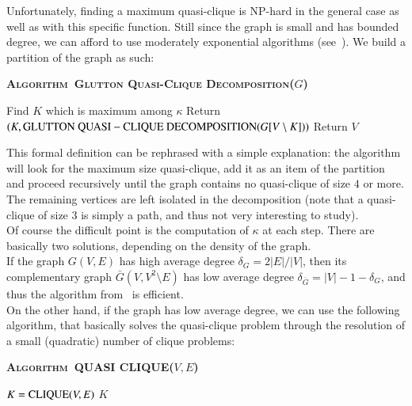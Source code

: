 \documentclass[preprint]{elsarticle}
\newcommand{\algo}[1]{\textsc{Algorithm~#1}}
\begin{document}
Unfortunately, finding a maximum quasi-clique is NP-hard in the general case as well as with this specific function. Still since the graph is small and has bounded degree, we can afford to use moderately exponential algorithms (see~\cite{qis}). We build a partition of the graph as such:\\

\begin{algorithm}[ht!]
\textbf{\algo{Glutton Quasi-Clique Decomposition}($G$)}
\label{algo:glutton}
\begin{algorithmic}[1]
        \STATE Find $K$ which is maximum among $\kappa$
        \STATE Return $(K,{\rm GLUTTON~QUASI-CLIQUE~DECOMPOSITION}(G[V\setminus K]))$
    \ELSE
    	\STATE Return $V$
    \ENDIF
\end{algorithmic}
\end{algorithm}

This formal definition can be rephrased with a simple explanation: the algorithm will look for the maximum size quasi-clique, add it as an item of the partition and proceed recursively until the graph contains no quasi-clique of size $4$ or more. The remaining vertices are left isolated in the decomposition (note that a quasi-clique of size $3$ is simply a path, and thus not very interesting to study).\\

Of course the difficult point is the computation of $\kappa$ at each step. There are basically two solutions, depending on the density of the graph.\\

If the graph $G(V,E)$ has high average degree $\delta_G = 2|E|/|V|$, then its complementary graph $\bar{G}(V,V^2\setminus E)$ has low average degree $\delta_{\bar{G}} = |V|-1-\delta_G$, and thus the algorithm from~\cite{qis} is efficient.\\

On the other hand, if the graph has low average degree, we can use the following algorithm, that basically solves the quasi-clique problem through the resolution of a small (quadratic) number of clique problems:

\begin{algorithm}[ht!]
\textbf{\algo{QUASI CLIQUE}($V,E$)}
\label{algo:param}
\begin{algorithmic}[1]
	\STATE $K = {\rm CLIQUE}(V,E)$
	\ENDFOR
	\RETURN $K$
\end{algorithmic}
\end{algorithm}
\end{document}
